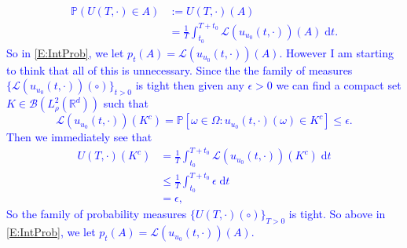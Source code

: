 \documentclass{article}
\numberwithin{equation}{section}
\newcommand{\R}{\mathbb{R}}
\newcommand{\ud}{\ensuremath{\mathrm{d}}}
\begin{document}
\bigskip
\textcolor{blue}{
 	\begin{align*}
		\mathbb{P}\left(U(T,\cdot) \in A \right) &:= U(T,\cdot)(A) \\
		&= \frac{1}{T} \int_{t_0}^{T + t_0} \mathscr{L}(u_{u_0}(t,\cdot))(A) \; \ud t.
	\end{align*}
So in \eqref{E:IntProb}, we let $p_t(A) = \mathscr{L}(u_{u_0}(t,\cdot))(A)$. However I am starting to think that all of this is unnecessary. Since the the family of measures $\{\mathscr{L}(u_{u_0}(t,\cdot))(\circ)\}_{t>0}$ is tight then given any $\epsilon >0$ we can find a compact set $K \in \mathscr{B}(L_\rho^2(\R^d))$ such that
	\[
		\mathscr{L}(u_{u_0}(t,\cdot))(K^c) = \mathbb{P}\left[\omega \in \Omega : u_{u_0}(t,\cdot)(\omega) \in K^c \right] \le \epsilon.
	\]
Then we immediately see that
	\begin{align*}
		U(T,\cdot)(K^c) &= \frac{1}{T} \int_{t_0}^{T + t_0} \mathscr{L}(u_{u_0}(t,\cdot))(K^c) \; \ud t \\
		&\le \frac{1}{T} \int_{t_0}^{T + t_0} \epsilon \; \ud t \\
		&= \epsilon,
	\end{align*}
So the family of probability measures $\{U(T,\cdot)(\circ) \}_{T>0}$ is tight. So above in \eqref{E:IntProb}, we let $p_t(A) = \mathscr{L}(u_{u_0}(t,\cdot))(A)$.
}
\end{document}
